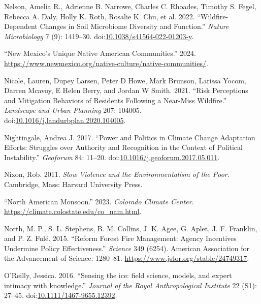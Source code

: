 \documentclass[
]{article}
\newlength{\cslhangindent}
\newenvironment{CSLReferences}[2] %
 {\begin{list}{}{%
  \setlength{\itemindent}{0pt}
  \setlength{\leftmargin}{0pt}
  \setlength{\parsep}{0pt}
  \ifodd #1
   \setlength{\leftmargin}{\cslhangindent}
   \setlength{\itemindent}{-1\cslhangindent}
  \fi
  \setlength{\itemsep}{#2\baselineskip}}}
 {\end{list}}
\begin{document}
\begin{CSLReferences}{1}{0}
Nelson, Amelia R., Adrienne B. Narrowe, Charles C. Rhoades, Timothy S. Fegel, Rebecca A. Daly, Holly K. Roth, Rosalie K. Chu, et al. 2022. {``Wildfire-Dependent Changes in Soil Microbiome Diversity and Function.''} \emph{Nature Microbiology} 7 (9): 1419--30. doi:\href{https://doi.org/10.1038/s41564-022-01203-y}{10.1038/s41564-022-01203-y}.

{``New {Mexico}'s {Unique Native American Communities}.''} 2024. \url{https://www.newmexico.org/native-culture/native-communities/}.

Nicole, Lauren, Dupey Larsen, Peter D Howe, Mark Brunson, Larissa Yocom, Darren Mcavoy, E Helen Berry, and Jordan W Smith. 2021. {``Risk Perceptions and Mitigation Behaviors of Residents Following a Near-Miss Wildfire.''} \emph{Landscape and Urban Planning} 207: 104005. doi:\href{https://doi.org/10.1016/j.landurbplan.2020.104005}{10.1016/j.landurbplan.2020.104005}.

Nightingale, Andrea J. 2017. {``Power and Politics in Climate Change Adaptation Efforts: {Struggles} over Authority and Recognition in the Context of Political Instability.''} \emph{Geoforum} 84: 11--20. doi:\href{https://doi.org/10.1016/j.geoforum.2017.05.011}{10.1016/j.geoforum.2017.05.011}.

Nixon, Rob. 2011. \emph{Slow Violence and the Environmentalism of the Poor}. Cambridge, Mass: Harvard University Press.

{``North {American Monsoon}.''} 2023. \emph{Colorado Climate Center}. \url{https://climate.colostate.edu/co_nam.html}.

North, M. P., S. L. Stephens, B. M. Collins, J. K. Agee, G. Aplet, J. F. Franklin, and P. Z. Fulé. 2015. {``Reform Forest Fire Management: {Agency} Incentives Undermine Policy Effectiveness.''} \emph{Science} 349 (6254). American Association for the Advancement of Science: 1280--81. \url{https://www.jstor.org/stable/24749317}.

O'Reilly, Jessica. 2016. {``{Sensing the ice: field science, models, and expert intimacy with knowledge}.''} \emph{Journal of the Royal Anthropological Institute} 22 (S1): 27--45. doi:\href{https://doi.org/10.1111/1467-9655.12392}{10.1111/1467-9655.12392}.


\end{CSLReferences}
\end{document}
